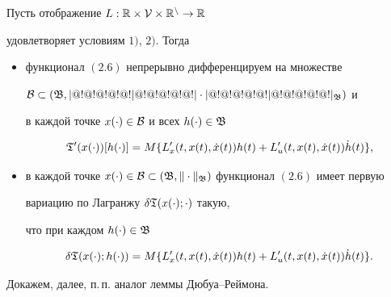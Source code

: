 \begin{lems}


Пусть отображение $L:\Bbb R\times\cal V\times\Bbb R^n\to\Bbb R$ 


удовлетворяет условиям $1)$, $2)$. Тогда


\begin{itemize}


\item[а)] функционал $(2.6)$ непрерывно дифференцируем на множестве


$\cal B\subset(\frak B,|@!@!@!@!@!|@!@!@!@!@!|\cdot|@!@!@!@!@!|@!@!@!@!@!|_{\frak B})$ и


в каждой точке $x(\cdot)\in\cal B$ и всех $h(\cdot)\in\frak B$


\begin{equation}


\frak T'(x(\cdot))[h(\cdot)]=M\{L'_x(t,x(t),\Dot x(t))h(t)+


L'_u(t,x(t),\Dot x(t))\Dot h(t)\},


\end{equation}


\item[б)] в каждой точке $x(\cdot)\in\cal B\subset(\frak


B,\|\cdot\|_{\frak B})$ функционал $(2.6)$ имеет первую


вариацию по Лагранжу $\delta\frak T(x(\cdot);\cdot)$ такую,


что при каждом $h(\cdot)\in\frak B$


\begin{equation}


\delta\frak T(x(\cdot);h(\cdot))=M\{L'_x(t,x(t),\Dot


x(t))h(t)+L'_u(t,x(t),\Dot x(t))\Dot h(t)\}.


\end{equation}


\end{itemize}


\end{lems}





Докажем, далее, п.\,п. аналог леммы Дюбуа--Реймона.





